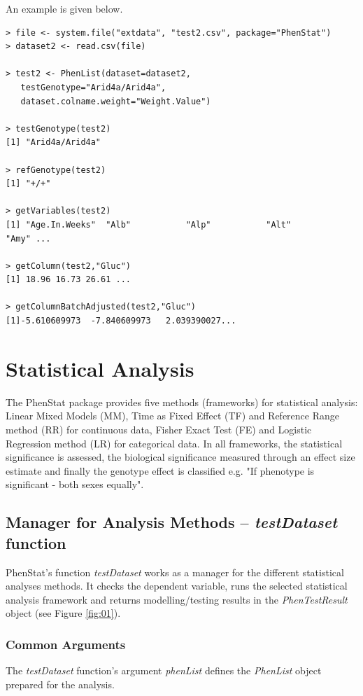 \documentclass[12pt,a4paper]{article}
\begin{document}
An example is given below.


\begingroup
    \fontsize{8pt}{12pt}\selectfont
\begin{verbatim}
> file <- system.file("extdata", "test2.csv", package="PhenStat") 
> dataset2 <- read.csv(file)

> test2 <- PhenList(dataset=dataset2,
   testGenotype="Arid4a/Arid4a",
   dataset.colname.weight="Weight.Value")

> testGenotype(test2)
[1] "Arid4a/Arid4a"

> refGenotype(test2)
[1] "+/+"

> getVariables(test2)
[1] "Age.In.Weeks"  "Alb"           "Alp"           "Alt"           "Amy" ...

> getColumn(test2,"Gluc")
[1] 18.96 16.73 26.61 ...

> getColumnBatchAdjusted(test2,"Gluc")
[1]-5.610609973  -7.840609973   2.039390027...

\end{verbatim}
\endgroup
\section{Statistical Analysis}
The PhenStat package provides five methods (frameworks) for statistical analysis: Linear Mixed Models (MM), Time as Fixed Effect (TF) and Reference Range method (RR) for continuous data, Fisher Exact Test (FE) and Logistic Regression method (LR) for categorical data. In all frameworks, 
the statistical significance is assessed, the biological significance measured through an effect size estimate and finally the genotype effect is classified e.g. "If phenotype is significant - both sexes equally".  


\subsection{Manager for Analysis Methods -- \textit{testDataset} function}
PhenStat's function \textit{testDataset} works as a manager for the different statistical analyses methods. It checks the dependent variable, runs the selected statistical analysis framework and
 returns modelling\slash testing results in the \textit{PhenTestResult} object (see Figure \ref{fig:01}). 
 
\subsubsection{Common Arguments}
The \textit{testDataset} function's argument \textit{phenList} defines the \textit{PhenList} object prepared for the analysis.
\end{document}
